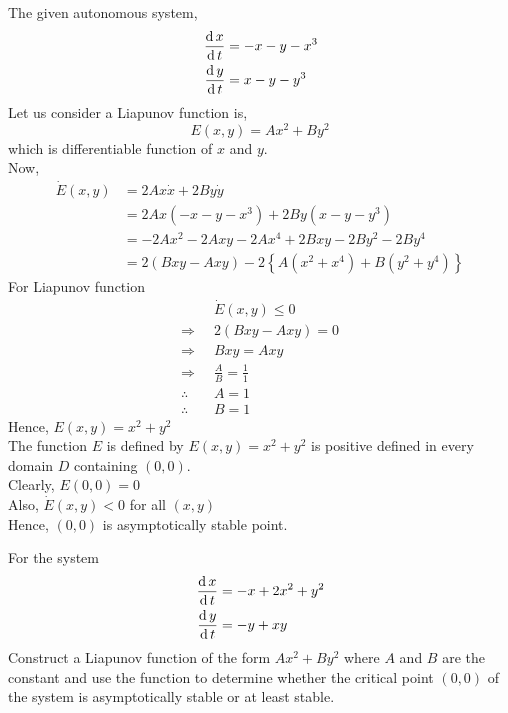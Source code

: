 \documentclass[../main-sheet.tex]{subfiles}
\begin{document}
\begin{soln}
    The given autonomous system,
    \begin{align*}
        \,\frac{\mathrm{d}\,x}{\mathrm{d}\,t}&=-x-y-x^3\\
        \,\frac{\mathrm{d}\,y}{\mathrm{d}\,t}&=x-y-y^3
    \end{align*}
    Let us consider a Liapunov function is,
    \[E(x,y)=Ax^2+By^2\]
    which is differentiable function of \(x\) and \(y\).\\
    Now,
    \begin{align*}
        \dot{E}(x,y)&=2Ax\dot{x}+2By\dot{y}\\
        &=2Ax(-x-y-x^3)+2By(x-y-y^3)\\
        &=-2Ax^2-2Axy-2Ax^4+2Bxy-2By^2-2By^4\\
        &=2(Bxy-Axy)-2\left\{ A(x^2+x^4)+B(y^2+y^4) \right\}
    \end{align*}
    For Liapunov function
    \begin{align*}
        & \dot{E}(x,y)\leq 0\\
        \Rightarrow\;\; & 2(Bxy-Axy)= 0\\
        \Rightarrow\;\; & Bxy=Axy\\
        \Rightarrow\;\; & \frac{A}{B}=\frac{1}{1}\\
        \therefore\;\; & A=1\\
        \therefore\;\; & B=1
    \end{align*}
    Hence, \(E(x,y)=x^2+y^2\)\\
    The function \(E\) is defined by \(E(x,y)=x^2+y^2\) is positive defined in every domain \(D\) containing \((0,0)\).\\
    Clearly, \(E(0,0)=0\)\\
    Also, \(\dot{E}(x,y)<0\) for all \((x,y)\)\\
    Hence, \((0,0)\) is asymptotically stable point.
\end{soln}
\begin{prob}
    For the system 
    \begin{align*}
        \,\frac{\mathrm{d}\,x}{\mathrm{d}\,t}&=-x+2x^2+y^2\\
        \,\frac{\mathrm{d}\,y}{\mathrm{d}\,t}&=-y+xy
    \end{align*}
    Construct a Liapunov function of the form \(Ax^2+By^2\) where \(A\) and \(B\) are the constant and use the function to determine whether the critical point \((0,0)\) of the system is asymptotically stable or at least stable.
\end{prob}
\end{document}
